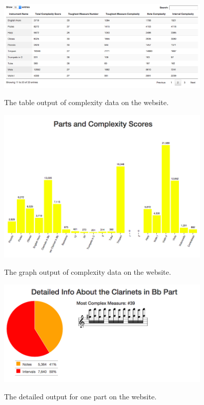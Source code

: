 \documentclass[12pt]{report}
\begin{document}
\begin{figure}
	\centering
		\caption{The table output of complexity data on the website.}
		\includegraphics[width=0.9\textwidth]{WebsiteTable.png}
		\label{image:websitetable}
\end{figure}

\begin{figure}
	\centering
		\caption{The graph output of complexity data on the website.}
		\includegraphics[width=0.9\textwidth]{WebsiteGraph.png}
		\label{image:websitegraph}
\end{figure}

\begin{figure}
	\centering
		\caption{The detailed output for one part on the website.}
		\includegraphics[width=0.9\textwidth]{WebsiteDetails.png}
		\label{image:websitedetails}
\end{figure}
\end{document}
